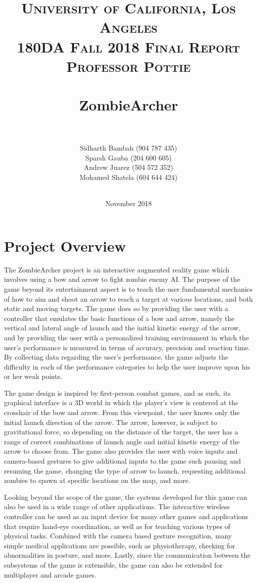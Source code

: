\documentclass[titlepage, 12pt]{scrartcl}
\title{
		\vspace{-1in} 	
		\usefont{OT1}{bch}{b}{n}
		\normalfont \normalsize \textsc{University of California, Los Angeles \\
		180DA Fall 2018 Final Report \\
		Professor Pottie} \\ [25pt]
		\horrule{0.5pt} \\
		\Huge ZombieArcher \\
		\vspace{-.3in}
		\horrule{2pt} \\
		\vspace{1in}
}
\author{Sidharth Bambah (904 787 435)\\
        Sparsh Gauba (204 600 605)\\
        Andrew Juarez (504 572 352)\\
        Mohamed Shatela (604 644 424)\\\\
        \vspace{1in}
        }
\date{ \large November 2018}
\begin{document}
\maketitle
\tableofcontents
\newpage
\section{Project Overview}
    The ZombieArcher project is an interactive augmented reality game which involves using a bow and arrow to fight zombie enemy AI. The purpose of the game beyond its entertainment aspect is to teach the user fundamental mechanics of how to aim and shoot an arrow to reach a target at various locations, and both static and moving targets. The game does so by providing the user with a controller that emulates the basic functions of a bow and arrow, namely the vertical and lateral angle of launch and the initial kinetic energy of the arrow, and by providing the user with a personalized training environment in which the user’s performance is measured in terms of accuracy, precision and reaction time. By collecting data regarding the user’s performance, the game adjusts the difficulty in each of the performance categories to help the user improve upon his or her weak points. \par
    The game design is inspired by first-person combat games, and as such, its graphical interface is a 3D world in which the player’s view is centered at the crosshair of the bow and arrow. From this viewpoint, the user knows only the initial launch direction of the arrow. The arrow, however, is subject to gravitational force, so depending on the distance of the target, the user has a range of correct combinations of launch angle and initial kinetic energy of the arrow to choose from. The game also provides the user with voice inputs and camera-based gestures to give additional inputs to the game such pausing and resuming the game, changing the type of arrow to launch, requesting additional zombies to spawn at specific locations on the map, and more. \par
    Looking beyond the scope of the game, the systems developed for this game can also be used in a wide range of other applications. The interactive wireless controller can be used as an input device for many other games and applications that require hand-eye coordination, as well as for teaching various types of physical tasks. Combined with the camera based gesture recognition, many simple medical applications are possible, such as physiotherapy, checking for abnormalities in posture, and more. Lastly, since the communication between the subsystems of the game is extensible, the game can also be extended for multiplayer and arcade games. \par
\end{document}
